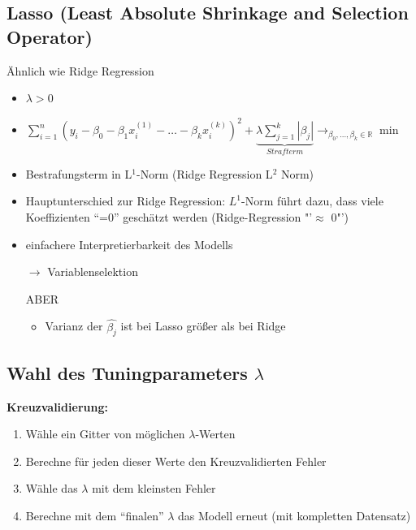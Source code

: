 \documentclass[10pt]{report}
\theoremstyle{definition}
\begin{document}
\subsection{Lasso (Least Absolute Shrinkage and Selection Operator)}
Ähnlich wie Ridge Regression 
\begin{itemize}
	\item \(\lambda > 0 \)
	\item \(\sum_{i = 1}^{n}(y_i -\beta_0 - \beta_1 x_i^{(1)} - \ldots - \beta_k x_i^{(k)})^2 + \underbrace{\lambda \sum_{j = 1}^{k}|\beta_j|}_{Strafterm}
	\rightarrow_{\beta_0, \ldots, \beta_k \in \mathbb{R}} \min \)
	\item Bestrafungsterm in L$^1$-Norm (Ridge Regression L$^2$ Norm)
	\item Hauptunterschied zur Ridge Regression: $L^1$-Norm führt dazu, dass viele Koeffizienten "`=0"' geschätzt werden (Ridge-Regression "'$\approx$ 0"')
	\item einfachere Interpretierbarkeit des Modells
	\item [\(\rightarrow\)] Variablenselektion
	\item [ABER]
	\begin{itemize}
		\item Varianz der $ \hat{\beta_j} $ ist bei Lasso größer als bei Ridge
	\end{itemize}
\end{itemize}


\subsection{Wahl des Tuningparameters $\lambda$}
\textbf{Kreuzvalidierung:}
\begin{enumerate}
	\item Wähle ein Gitter von möglichen $\lambda$-Werten
	\item Berechne für jeden dieser Werte den Kreuzvalidierten Fehler
	\item Wähle das \(\lambda\) mit dem kleinsten Fehler
	\item Berechne mit dem "`finalen"' \( \lambda \) das Modell erneut (mit kompletten Datensatz)
\end{enumerate}
\end{document}
